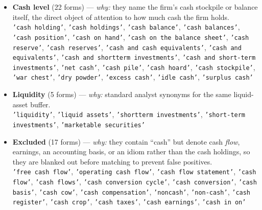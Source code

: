 \begin{itemize}\setlength\itemsep{3pt}
\item \textbf{Cash level} (22 forms) --- \emph{why:} they name the firm's cash stockpile or balance itself, the direct object of attention to how much cash the firm holds. \\ \texttt{'cash holding'}, \texttt{'cash holdings'}, \texttt{'cash balance'}, \texttt{'cash balances'}, \texttt{'cash position'}, \texttt{'cash on hand'}, \texttt{'cash on the balance sheet'}, \texttt{'cash reserve'}, \texttt{'cash reserves'}, \texttt{'cash and cash equivalents'}, \texttt{'cash and equivalents'}, \texttt{'cash and shortterm investments'}, \texttt{'cash and short-term investments'}, \texttt{'net cash'}, \texttt{'cash pile'}, \texttt{'cash hoard'}, \texttt{'cash stockpile'}, \texttt{'war chest'}, \texttt{'dry powder'}, \texttt{'excess cash'}, \texttt{'idle cash'}, \texttt{'surplus cash'}
\item \textbf{Liquidity} (5 forms) --- \emph{why:} standard analyst synonyms for the same liquid-asset buffer. \\ \texttt{'liquidity'}, \texttt{'liquid assets'}, \texttt{'shortterm investments'}, \texttt{'short-term investments'}, \texttt{'marketable securities'}
\item \textbf{Excluded} (17 forms) --- \emph{why:} they contain ``cash'' but denote cash \emph{flow}, earnings, an accounting basis, or an idiom rather than the cash holdings, so they are blanked out before matching to prevent false positives. \\ \texttt{'free cash flow'}, \texttt{'operating cash flow'}, \texttt{'cash flow statement'}, \texttt{'cash flow'}, \texttt{'cash flows'}, \texttt{'cash conversion cycle'}, \texttt{'cash conversion'}, \texttt{'cash basis'}, \texttt{'cash cow'}, \texttt{'cash compensation'}, \texttt{'noncash'}, \texttt{'non-cash'}, \texttt{'cash register'}, \texttt{'cash crop'}, \texttt{'cash taxes'}, \texttt{'cash earnings'}, \texttt{'cash in on'}
\end{itemize}
